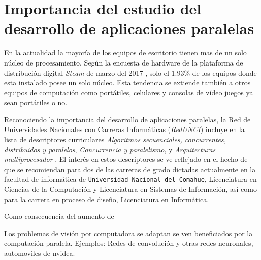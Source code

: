 
\section{Importancia del estudio del desarrollo de aplicaciones paralelas}

En la actualidad la mayoría de los equipos de escritorio tienen mas de un solo
núcleo de procesamiento. Según la encuesta de hardware de la plataforma de
distribución digital \emph{Steam} de marzo del 2017 \cite{steamSurvey}, solo
el $1.93$\% de los equipos donde esta instalado posee un solo núcleo. Esta
tendencia se extiende también a otros equipos de computación como portátiles,
celulares y consolas de vídeo juegos ya sean portátiles o no.

Reconociendo la importancia del desarrollo de aplicaciones paralelas, la Red
de Universidades Nacionales con Carreras Informáticas (\emph{RedUNCI}) incluye
en la lista de descriptores curriculares \emph{Algoritmos secuenciales,
concurrentes, distribuidos y paralelos}, \emph{Concurrencia y paralelismo}, y
\emph{Arquitecturas multiprocesador} \cite{RedUNCI2015}. El interés en estos
descriptores se ve reflejado en el hecho de que se recomiendan para dos de las
carreras de grado dictadas actualmente en la facultad de informática de
\texttt{Universidad Nacional del Comahue}, Licenciatura en Ciencias de la
Computación y Licenciatura en Sistemas de Información, así como para la
carrera en proceso de diseño, Licenciatura en Informática.

Como consecuencia del aumento de 


Los problemas de visión por computadora se adaptan se ven beneficiados por la
computación paralela. Ejemplos: Redes de convolución y otras redes neuronales,
automoviles de nvidea.
